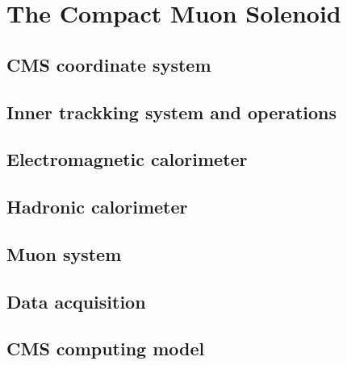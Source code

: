 \section{The Compact Muon Solenoid}
\subsection{CMS coordinate system}
\subsection{Inner trackking system and operations}
\subsection{Electromagnetic calorimeter}
\subsection{Hadronic calorimeter}
\subsection{Muon system}
\subsection{Data acquisition}
\subsection{CMS computing model}
